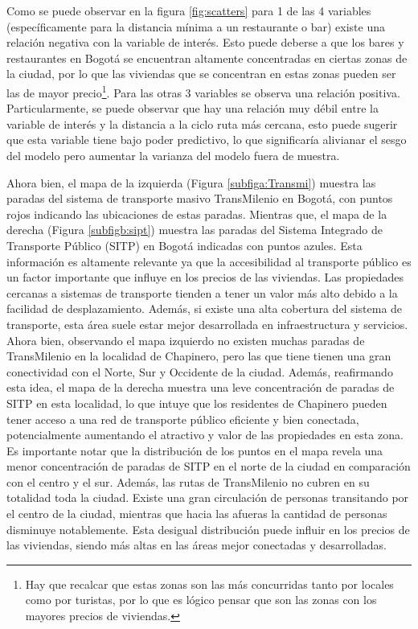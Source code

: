 \documentclass[10pt]{article}
\begin{document}



Como se puede observar en la figura \ref{fig:scatters}  para 1 de las 4 variables (específicamente para la distancia mínima a un restaurante o bar) existe una relación negativa con la variable de interés. Esto puede deberse a que los bares y restaurantes en Bogotá se encuentran altamente concentradas en ciertas zonas de la ciudad, por lo que las viviendas que se concentran en estas zonas pueden ser las de mayor precio\footnote{Hay que recalcar que estas zonas son las más concurridas tanto por locales como por turistas, por lo que es lógico pensar que son las zonas con los mayores precios de viviendas.}. Para las otras 3 variables se observa una relación positiva. Particularmente, se puede observar que hay una relación muy débil entre la variable de interés y la distancia a la ciclo ruta más cercana, esto puede sugerir que esta variable tiene bajo poder predictivo, lo que significaría alivianar el sesgo del modelo pero aumentar la varianza del modelo fuera de muestra.



Ahora bien, el mapa de la izquierda (Figura \ref{subfiga:Transmi}) muestra las paradas del sistema de transporte masivo TransMilenio en Bogotá, con puntos rojos indicando las ubicaciones de estas paradas. Mientras que, el mapa de la derecha (Figura \ref{subfigb:sipt}) muestra las paradas del Sistema Integrado de Transporte Público (SITP) en Bogotá indicadas con puntos azules. Esta información es altamente relevante ya que la accesibilidad al transporte público es un factor importante que influye en los precios de las viviendas. Las propiedades cercanas a sistemas de transporte tienden a tener un valor más alto debido a la facilidad de desplazamiento. Además, si existe una alta cobertura del sistema de transporte, esta área suele estar mejor desarrollada en infraestructura y servicios. Ahora bien, observando el mapa izquierdo no existen muchas paradas de TransMilenio en la localidad de Chapinero, pero las que tiene tienen una gran conectividad con el Norte, Sur y Occidente de la ciudad. Además, reafirmando esta idea, el mapa de la derecha muestra una leve concentración de paradas de SITP en esta localidad, lo que intuye que los residentes de Chapinero pueden tener acceso a una red de transporte público eficiente y bien conectada, potencialmente aumentando el atractivo y valor de las propiedades en esta zona. \\

Es importante notar que la distribución de los puntos en el mapa revela una menor concentración de paradas de SITP en el norte de la ciudad en comparación con el centro y el sur. Además, las rutas de TransMilenio no cubren en su totalidad toda la ciudad. Existe una gran circulación de personas transitando por el centro de la ciudad, mientras que hacia las afueras la cantidad de personas disminuye notablemente. Esta desigual distribución puede influir en los precios de las viviendas, siendo más altas en las áreas mejor conectadas y desarrolladas.
\end{document}
